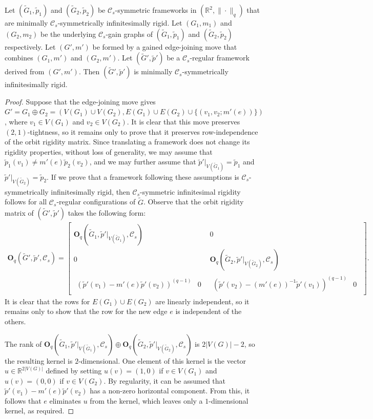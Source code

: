 \documentclass[10pt,a4paper]{amsart}
\newcommand{\G}{\tilde{G}}
\newcommand{\R}{\mathbb{R}}
\newcommand{\p}{\tilde{p}}
\begin{document}
    \begin{proposition}\label{LqCsJoiningExtension}
		Let $(\G_1,\p_1)$ and $(\G_2,\p_2)$ be $\mathcal{C}_s$-symmetric frameworks in $(\R^2,\|\cdot\|_q)$ that are minimally $\mathcal{C}_s$-symmetrically infinitesimally rigid. Let $(G_1,m_1)$ and $(G_2,m_2)$ be the underlying $\mathcal{C}_s$-gain graphs of $(\G_1,\p_1)$ and $(\G_2,\p_2)$ respectively. Let $(G',m')$ be formed by a gained edge-joining move that combines $(G_1,m')$ and $(G_2,m')$. Let $(\G',\p')$ be a $\mathcal{C}_s$-regular framework derived from $(G',m')$. Then $(\G',\p')$ is minimally $\mathcal{C}_s$-symmetrically infinitesimally rigid.
	\end{proposition}

	\begin{proof}
		Suppose that the edge-joining move gives $G'= G_1\oplus G_2=(V(G_1)\cup V(G_2),E(G_1)\cup E(G_2)\cup\{(v_1,v_2;m'(e))\})$, where $v_1\in V(G_1)$ and $v_2\in V(G_2)$. It is clear that this move preserves $(2,1)$-tightness, so it remains only to prove that it preserves row-independence of the orbit rigidity matrix. Since translating a framework does not change its rigidity properties, without loss of generality, we may assume that $\tilde{p}_1(v_1)\neq m'(e)\tilde{p}_2(v_2)$, and  we may further assume that $\p'|_{V(\G_1)}=\p_1$ and $\p'|_{V(\G_2)}=\p_2$. If we prove that a framework following these assumptions is $\mathcal{C}_s$-symmetrically infinitesimally rigid, then $\mathcal{C}_s$-symmetric infinitesimal rigidity follows for all $\mathcal{C}_s$-regular configurations of $\G$. Observe that the orbit rigidity matrix of $(\G',\p')$ takes the following form:
		\begin{align*}
			\mathbf{O}_q(\G',\p',\mathcal{C}_s)=
			\begin{bmatrix}
				\mathbf{O}_q(\G_1,\p'|_{V(\G_1)},\mathcal{C}_s)&0\\
				0&\mathbf{O}_q(\G_2,\p'|_{V(\G_2)},\mathcal{C}_s)\\
				\begin{matrix}
					(\p'(v_1)-m'(e)\p'(v_2))^{(q-1)}&0
				\end{matrix}
				&
				\begin{matrix}
					(\p'(v_2)-(m'(e))^{-1}\p'(v_1))^{(q-1)}&0
				\end{matrix}
			\end{bmatrix}
			.
		\end{align*}
		It is clear that the rows for $E(G_1)\cup E(G_2)$ are linearly independent, so it remains only to show that the row for the new edge $e$ is independent of the others.

        The rank of $\mathbf{O}_q(\G_1,\p'|_{V(\G_1)},\mathcal{C}_s)\oplus\mathbf{O}_q(\G_2,\p'|_{V(\G_2)},\mathcal{C}_s)$ is $2|V(G)|-2$, so the resulting kernel is $2$-dimensional. One element of this kernel is the vector $u\in \R^{2|V(G)|}$ defined by setting $u(v)=(1,0)$ if $v\in V(G_1)$ and $u(v)=(0,0)$ if $v\in V(G_2)$. By regularity, it can be assumed that $\p'(v_1)-m'(e)\p'(v_2)$ has a non-zero horizontal component. From this, it follows that $e$ eliminates $u$ from the kernel, which leaves only a $1$-dimensional kernel, as required.
	\end{proof}
\end{document}
